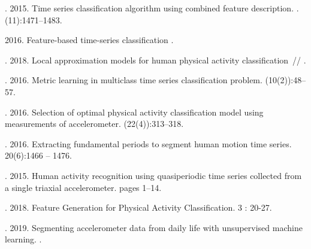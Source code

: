 \documentclass[12pt, twoside]{article}
\begin{document}
 	

\maketitleSecondary
\English
\begin{thebibliography}{99}

	. 2015.
	 Time series classification algorithm using combined feature description. .
	 (11):1471–1483.

	 2016.
	Feature-based time-series classification
	.
	
	. 2018.
	Local approximation models for human physical activity classification~//
	.

	. 2016.
	 Metric learning in multiclass time series classification problem.
	 (10(2)):48–57.

	. 2016.
	 Selection of optimal physical activity classification model using measurements of accelerometer.
	  (22(4)):313–318.

	. 2016.
	 Extracting fundamental periods to segment human motion time series.
	  20(6):1466 – 1476.

	. 2015.
	 Human activity recognition using quasiperiodic time series collected from a single triaxial accelerometer.
	  pages 1–14.
	
	. 2018.
	Feature Generation for Physical Activity Classification.
	  3 : 20-27.

	. 2019.
	 Segmenting accelerometer data from daily life with unsupervised machine learning.
    .
    

\end{thebibliography}
\end{document}
